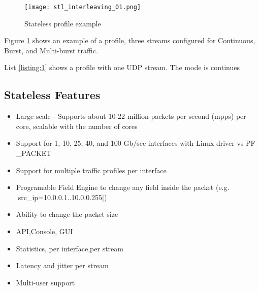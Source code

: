 \documentclass[conference]{IEEEtran}
\begin{document}
\begin{figure}[h]
  \texttt{[image: stl\_interleaving\_01.png]}
  \caption{Stateless profile example}
  \label{fig:stlhello}
\end{figure}

Figure \ref{fig:stlhello} shows an example of a profile, three streams configured for Continuous, Burst, and Multi-burst traffic.

List \ref{listing:1} shows a profile with one UDP stream. The mode is continues 

  
\subsection{Stateless Features}

\begin{itemize}
  \item Large scale - Supports about 10-22 million packets per second (mpps) per core, scalable with the number of cores
  \item Support for 1, 10, 25, 40, and 100 Gb/sec interfaces with Linux driver vs PF\\\_PACKET
  \item Support for multiple traffic profiles per interface
  \item Programable Field Engine to change any field inside the packet (e.g. |src_ip=10.0.0.1..10.0.0.255|)
  \item Ability to change the packet size 
  \item API,Console, GUI
  \item Statistics, per interface,per stream 
  \item Latency and jitter per stream
  \item Multi-user support 
\end{itemize}
\end{document}
